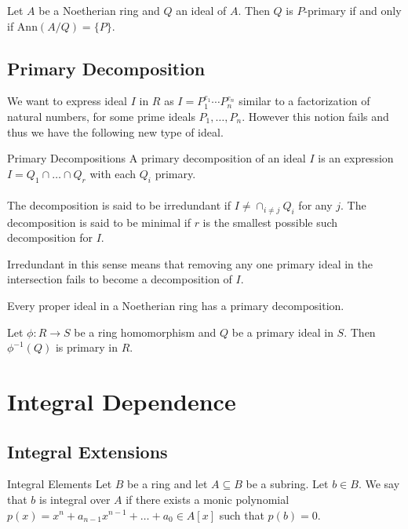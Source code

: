 \documentclass[a4paper]{article}
\begin{document}
\begin{thm}{}{} Let $A$ be a Noetherian ring and $Q$ an ideal of $A$. Then $Q$ is $P$-primary if and only if $\text{Ann}(A/Q)=\{P\}$. 
\end{thm}

\subsection{Primary Decomposition}
We want to express ideal $I$ in $R$ as $I=P_1^{e_1}\cdots P_n^{e_n}$ similar to a factorization of natural numbers, for some prime ideals $P_1,\dots,P_n$. However this notion fails and thus we have the following new type of ideal. 

\begin{defn}{Primary Decompositions}{} A primary decomposition of an ideal $I$ is an expression $I=Q_1\cap\dots\cap Q_r$ with each $Q_i$ primary. \\~\\
The decomposition is said to be irredundant if $I\neq\cap_{i\neq j}Q_i$ for any $j$. The decomposition is said to be minimal if $r$ is the smallest possible such decomposition for $I$. 
\end{defn}

Irredundant in this sense means that removing any one primary ideal in the intersection fails to become a decomposition of $I$. 

\begin{thm}{}{} Every proper ideal in a Noetherian ring has a primary decomposition. 
\end{thm}

\begin{lmm}{}{} Let $\phi:R\to S$ be a ring homomorphism and $Q$ be a primary ideal in $S$. Then $\phi^{-1}(Q)$ is primary in $R$. 
\end{lmm}

\pagebreak
\section{Integral Dependence}
\subsection{Integral Extensions}
\begin{defn}{Integral Elements}{} Let $B$ be a ring and let $A\subseteq B$ be a subring. Let $b\in B$. We say that $b$ is integral over $A$ if there exists a monic polynomial $p(x)=x^n+a_{n-1}x^{n-1}+\dots+a_0\in A[x]$ such that $p(b)=0$. 
\end{defn}
\end{document}
